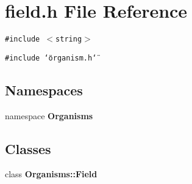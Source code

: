 \section{field.h File Reference}
\label{field_8h}
{\tt \#include $<$string$>$}\par
{\tt \#include \char`\"{}organism.h\char`\"{}}\par
\subsection*{Namespaces}
\begin{CompactItemize}
\item 
namespace \bf{Organisms}
\end{CompactItemize}
\subsection*{Classes}
\begin{CompactItemize}
\item 
class \bf{Organisms::Field}
\end{CompactItemize}
